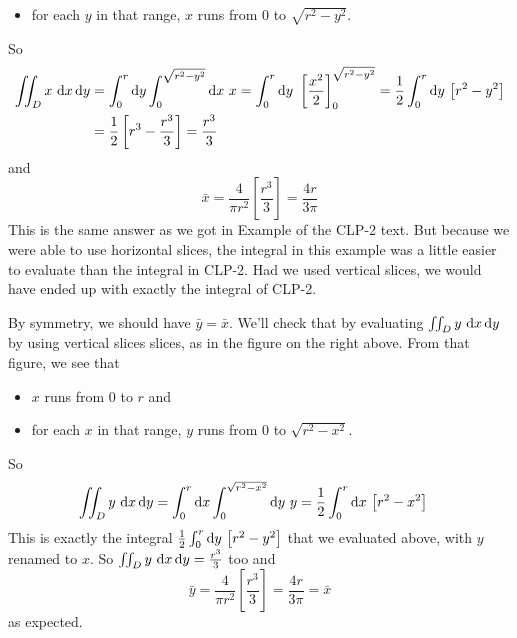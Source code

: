 \begin{eg}
\begin{itemize}
\item
for each $y$ in that range, $x$ runs from $0$ to $\sqrt{r^2-y^2}$.
\end{itemize}
So
\begin{align*}
\iint_D x\ \mathrm{d}x\,\mathrm{d}y
&= \int_0^r\mathrm{d}y\int_0^{\sqrt{r^2-y^2}}\mathrm{d}x \ x 
= \int_0^r\mathrm{d}y\ \left[\frac{x^2}{2}\right]_0^{\sqrt{r^2-y^2}} 
=\frac{1}{2} \int_0^r\mathrm{d}y\ \big[r^2-y^2\big] \\
&=\frac{1}{2}\left[r^3-\frac{r^3}{3}\right]
= \frac{r^3}{3}
\end{align*}
and
\begin{equation*}
\bar x 
= \frac{4}{\pi r^2}\left[\frac{r^3}{3}\right]
=\frac{4r}{3\pi}
\end{equation*}
This is the same answer as we got in Example  
of the CLP-2 text. But because we were able to use horizontal slices,
the integral in this example was a little easier to evaluate than the
integral in CLP-2. Had we used vertical slices, we would have ended up 
with exactly the integral of CLP-2.


By symmetry, we should have $\bar y=\bar x$. We'll check that
by evaluating $\dblInt_D y\ \dee{x}\,\dee{y}$ by using vertical slices
slices, as in the figure on the right above. 
From that figure, we see that
\begin{itemize}
\item 
$x$ runs from $0$ to $r$ and
\item
for each $x$ in that range, $y$ runs from $0$ to $\sqrt{r^2-x^2}$.
\end{itemize}
So
\begin{align*}
\iint_D y\ \mathrm{d}x\,\mathrm{d}y
&= \int_0^r\mathrm{d}x\int_0^{\sqrt{r^2-x^2}}\mathrm{d}y \ y 
= \frac{1}{2}\int_0^r\mathrm{d}x\  \big[r^2-x^2\big] 
\end{align*}
This is exactly the  integral $\frac{1}{2} \int_0^r\dee{y}\ \big[r^2-y^2\big]$
that we evaluated above,  with $y$ renamed to $x$. 
So $\dblInt_D y\ \dee{x}\,\dee{y}=\frac{r^3}{3}$
too and
\begin{equation*}
\bar y 
= \frac{4}{\pi r^2}\left[\frac{r^3}{3}\right]
=\frac{4r}{3\pi}
=\bar x
\end{equation*}
as expected.
\end{eg}



